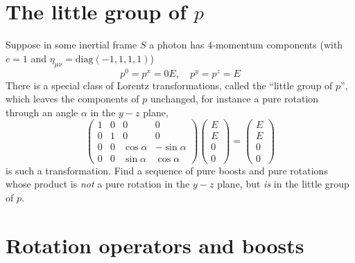\documentclass[a4paper, 11pt, oneside]{impression}
\begin{document}


\newpage

\chapter{The little group of \texorpdfstring{$p$}{}}\label{quest: three}

\begin{exercise}{}
    Suppose in some inertial frame $S$ a photon has $4$-momentum components (with $c = 1$ and $\eta_{\mu\nu}=\mathrm{diag}(-1, 1, 1, 1)$)
    \begin{equation*}
        p^{0} = p^{x} = 0E, \quad p^{y} = p^{z} = E
    \end{equation*}
    There is a special  class of Lorentz transformations, called the ``little group of  $p$'', which leaves the components of $p$ unchanged, for instance a pure rotation through an angle $\alpha$ in the $y-z$ plane,
    \begin{equation*}
        \begin{pmatrix}
            1 & 0 & 0 & 0 \\
            0 & 1 & 0 & 0 \\
            0 & 0 & \cos\alpha & -\sin\alpha \\
            0 & 0 & \sin\alpha & \cos\alpha
        \end{pmatrix}
        \begin{pmatrix}
            E \\
            E \\
            0 \\
            0
        \end{pmatrix} = 
        \begin{pmatrix}
            E \\
            E \\
            0 \\
            0
        \end{pmatrix}
    \end{equation*}
    is such a transformation. Find a sequence of pure boosts and pure rotations whose product is \textit{not} a pure rotation in the $y-z$ plane, but \textit{is} in the little group of $p$.
\end{exercise}



\newpage

\chapter{Rotation operators and boosts}\label{quest: four}
\end{document}
